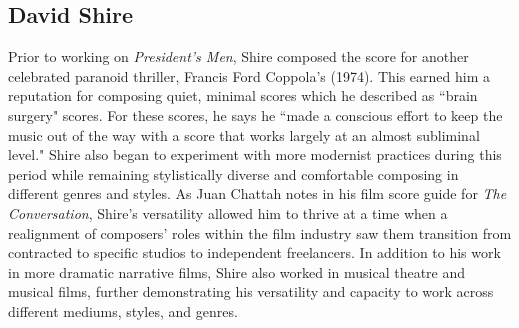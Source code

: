\subsection{David Shire}

Prior to working on \textit{President's Men}, Shire composed the score for another celebrated paranoid thriller, Francis Ford Coppola's  (1974). 
This earned him a reputation for composing quiet, minimal scores which he described as ``brain surgery" scores.\autocites[][18]{chattah_david_2015}[David Shire, quoted in][]{budinger_interview_1995}
For these scores, he says he ``made a conscious effort to keep the music out of the way with a score that works largely at an almost subliminal level."\autocites[][18]{chattah_david_2015}
Shire also began to experiment with more modernist practices during this period while remaining stylistically diverse and comfortable composing in different genres and styles.
As Juan Chattah notes in his film score guide for \textit{The Conversation}, Shire's versatility allowed him to thrive at a time when a realignment of composers' roles within the film industry saw them transition from contracted to specific studios to independent freelancers.\autocites[][23]{chattah_david_2015}[Caryl Flinn also discusses this shift in composer contracts, and I will explore this in more detail in the following chapter during my analysis of \textit{Alien}.][]{flinn_strains_1992}
In addition to his work in more dramatic narrative films, Shire also worked in musical theatre and musical films, further demonstrating his versatility and capacity to work across different mediums, styles, and genres.

